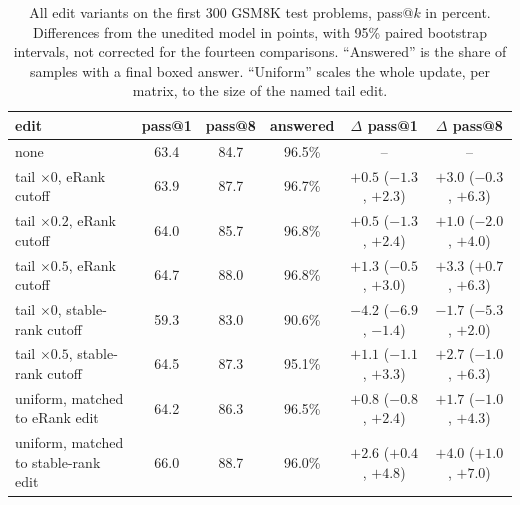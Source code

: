 \begin{table}[H]
\caption{All edit variants on the first 300 GSM8K test problems, pass@$k$ in
percent. Differences
from the unedited model in points, with 95\% paired bootstrap intervals,
not corrected for the fourteen comparisons. ``Answered'' is the share of
samples with a final boxed answer. ``Uniform'' scales the whole update, per
matrix, to the size of the named tail edit.}
\label{tab:cutoff300}
\begin{center}
\small
\begin{tabular}{lccccc}
\toprule
edit & pass@1 & pass@8 & answered & $\Delta$ pass@1 & $\Delta$ pass@8 \\
\midrule
none                                  & 63.4 & 84.7 & 96.5\% & -- & -- \\
tail $\times 0$, eRank cutoff         & 63.9 & 87.7 & 96.7\% & $+0.5$ ($-1.3$, $+2.3$) & $+3.0$ ($-0.3$, $+6.3$) \\
tail $\times 0.2$, eRank cutoff       & 64.0 & 85.7 & 96.8\% & $+0.5$ ($-1.3$, $+2.4$) & $+1.0$ ($-2.0$, $+4.0$) \\
tail $\times 0.5$, eRank cutoff       & 64.7 & 88.0 & 96.8\% & $+1.3$ ($-0.5$, $+3.0$) & $+3.3$ ($+0.7$, $+6.3$) \\
tail $\times 0$, stable-rank cutoff   & 59.3 & 83.0 & 90.6\% & $-4.2$ ($-6.9$, $-1.4$) & $-1.7$ ($-5.3$, $+2.0$) \\
tail $\times 0.5$, stable-rank cutoff & 64.5 & 87.3 & 95.1\% & $+1.1$ ($-1.1$, $+3.3$) & $+2.7$ ($-1.0$, $+6.3$) \\
uniform, matched to eRank edit         & 64.2 & 86.3 & 96.5\% & $+0.8$ ($-0.8$, $+2.4$) & $+1.7$ ($-1.0$, $+4.3$) \\
uniform, matched to stable-rank edit   & 66.0 & 88.7 & 96.0\% & $+2.6$ ($+0.4$, $+4.8$) & $+4.0$ ($+1.0$, $+7.0$) \\
\bottomrule
\end{tabular}
\end{center}
\end{table}
